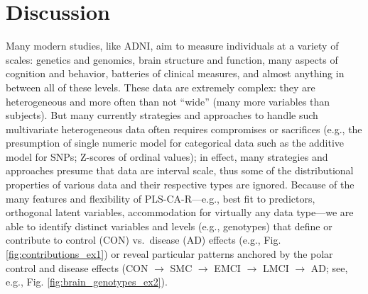 \documentclass[12pt]{article}
\begin{document}
\hypertarget{discussion}{%
\section{Discussion}\label{discussion}}

\label{section:Disc}

Many modern studies, like ADNI, aim to measure individuals at a variety
of scales: genetics and genomics, brain structure and function, many
aspects of cognition and behavior, batteries of clinical measures, and
almost anything in between all of these levels. These data are extremely
complex: they are heterogeneous and more often than not ``wide'' (many
more variables than subjects). But many currently strategies and
approaches to handle such multivariate heterogeneous data often requires
compromises or sacrifices (e.g., the presumption of single numeric model
for categorical data such as the additive model for SNPs; Z-scores of
ordinal values); in effect, many strategies and approaches presume that
data are interval scale, thus some of the distributional properties of
various data and their respective types are ignored. Because of the many
features and flexibility of PLS-CA-R---e.g., best fit to predictors,
orthogonal latent variables, accommodation for virtually any data
type---we are able to identify distinct variables and levels (e.g.,
genotypes) that define or contribute to control (CON) vs.~disease (AD)
effects (e.g., Fig. \ref{fig:contributions_ex1}) or reveal particular
patterns anchored by the polar control and disease effects (CON
\(\rightarrow\) SMC \(\rightarrow\) EMCI \(\rightarrow\) LMCI
\(\rightarrow\) AD; see, e.g., Fig. \ref{fig:brain_genotypes_ex2}).
\end{document}
